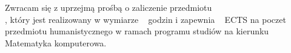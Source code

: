 \documentclass{wmiisubmission}
\begin{document}
\cracowdate
{}
\studentaddress
\addressee{\bakalarski}

\vskip 2.0cm

\noindent
Zwracam się z uprzejmą prośbą o zaliczenie przedmiotu\\
\fillField{16cm}, który jest realizowany w wymiarze \fillField{1cm}~ godzin
i zapewnia \fillField{1cm}~ ECTS na poczet
przedmiotu humanistycznego w ramach programu studiów na kierunku Matematyka komputerowa.

\vskip 1cm
\studentsignature
\vskip 3.0cm


\vskip 1.5cm

\end{document}
